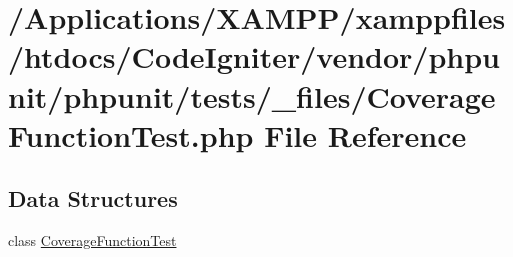 \hypertarget{phpunit_2tests_2__files_2_coverage_function_test_8php}{}\section{/\+Applications/\+X\+A\+M\+P\+P/xamppfiles/htdocs/\+Code\+Igniter/vendor/phpunit/phpunit/tests/\+\_\+files/\+Coverage\+Function\+Test.php File Reference}
\label{phpunit_2tests_2__files_2_coverage_function_test_8php}
\subsection*{Data Structures}
\begin{DoxyCompactItemize}
\item 
class \mbox{\hyperlink{class_coverage_function_test}{Coverage\+Function\+Test}}
\end{DoxyCompactItemize}
